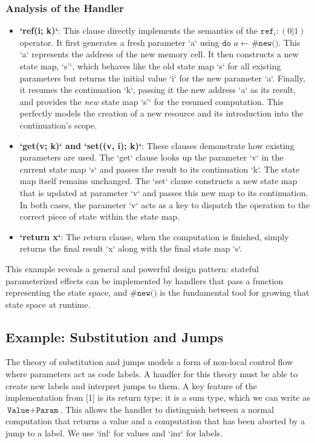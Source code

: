 \documentclass{article}
\begin{document}
\subsubsection{Analysis of the Handler}
\begin{itemize}
    \item \textbf{`ref(i; k)`}: This clause directly implements the semantics of the $\texttt{ref}_i: (0|1)$ operator. It first generates a fresh parameter `a` using $\texttt{do } a \leftarrow \texttt{\#new()}$. This `a` represents the address of the new memory cell. It then constructs a new state map, `s'`, which behaves like the old state map `s` for all existing parameters but returns the initial value `i` for the new parameter `a`. Finally, it resumes the continuation `k`, passing it the new address `a` as its result, and provides the \emph{new} state map `s'` for the resumed computation. This perfectly models the creation of a new resource and its introduction into the continuation's scope.

    \item \textbf{`get(v; k)` and `set((v, i); k)`}: These clauses demonstrate how existing parameters are used. The `get` clause looks up the parameter `v` in the current state map `s` and passes the result to its continuation `k`. The state map itself remains unchanged. The `set` clause constructs a new state map that is updated at parameter `v` and passes this new map to its continuation. In both cases, the parameter `v` acts as a key to dispatch the operation to the correct piece of state within the state map.

    \item \textbf{`return x`}: The return clause, when the computation is finished, simply returns the final result `x` along with the final state map `s`.
\end{itemize}
This example reveals a general and powerful design pattern: stateful parameterized effects can be implemented by handlers that pass a function representing the state space, and $\texttt{\#new()}$ is the fundamental tool for growing that state space at runtime.

\subsection{Example: Substitution and Jumps}
The theory of substitution and jumps models a form of non-local control flow where parameters act as code labels. A handler for this theory must be able to create new labels and interpret jumps to them. A key feature of the implementation from [1] is its return type: it is a sum type, which we can write as $\texttt{Value} + \texttt{Param}$. This allows the handler to distinguish between a normal computation that returns a value and a computation that has been aborted by a jump to a label. We use `inl` for values and `inr` for labels.
\end{document}
